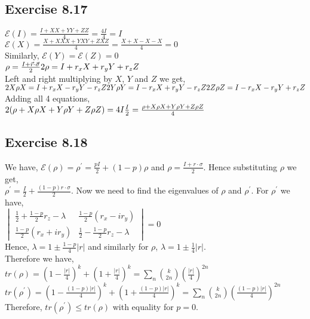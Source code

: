 \documentclass[a4paper,12pt]{article}
\begin{document}
\subsection*{Exercise 8.17}
$\mathcal{E}(I)=\frac{I+XX+YY+ZZ}{4}=\frac{4I}{4}=I$\\
$\mathcal{E}(X)=\frac{X+XXX+YXY+ZXZ}{4}=\frac{X+X-X-X}{4}=0$\\
Similarly, $\mathcal{E}(Y)=\mathcal{E}(Z)=0$\\
$\rho=\frac{I+\vec{r}\cdot\vec{\sigma}}{2}\\
2\rho=I+r_xX+r_yY+r_zZ$\\
Left and right multiplying by $X$, $Y$ and $Z$ we get,\\
$2X\rho X=I+r_xX-r_yY-r_zZ\\
2Y\rho Y=I-r_xX+r_yY-r_zZ\\
2Z\rho Z=I-r_xX-r_yY+r_zZ$\\
Adding all 4 equations,\\
$2(\rho+X\rho X+Y\rho Y+Z\rho Z)=4I\\
\frac{I}{2}=\frac{\rho+X\rho X+Y\rho Y+Z\rho Z}{4}$
\subsection*{Exercise 8.18}
We have, $\mathcal{E}(\rho)=\rho^\prime=\displaystyle \frac{pI}{2}+(1-p)\rho$ and
$\rho=\displaystyle\frac{I+r\cdot\sigma}{2}$. Hence substituting $\rho$ we get,\\
$\rho^\prime=\displaystyle \frac{I}{2}+\frac{(1-p)r\cdot\sigma}{2}$.
Now we need to find the eigenvalues of $\rho$ and $\rho^\prime$. For $\rho^\prime$ we have,\\
$\begin{vmatrix}
    \frac{1}{2}+\frac{1-p}{2}r_z-\lambda & \frac{1-p}{2}(r_x-ir_y)\\
    \frac{1-p}{2}(r_x+ir_y) &      \frac{1}{2}-\frac{1-p}{2}r_z-\lambda
\end{vmatrix}
=0$\\
Hence, $\lambda=1\pm\frac{1-p}{4}|r|$ and similarly for $\rho$, $\lambda=1\pm\frac{1}{4}|r|$.\\
Therefore we have,\\
$tr(\rho)=(1-\frac{|r|}{4})^k+(1+\frac{|r|}{4})^k=\displaystyle \sum_{n}{k\choose 2n}\left(\frac{|r|}{4}\right)^{2n}$\\
$tr(\rho^\prime)=(1-\frac{(1-p)|r|}{4})^k+(1+\frac{(1-p)|r|}{4})^k=\displaystyle \sum_{n}{k\choose 2n}\left(\frac{(1-p)|r|}{4}\right)^{2n}$\\
Therefore, $tr(\rho^\prime)\leq tr(\rho)$ with equality for $p=0$.
\end{document}
